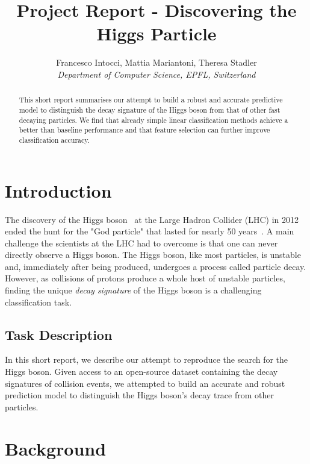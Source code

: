 \documentclass[10pt,conference,compsocconf]{IEEEtran}
\begin{document}
\title{Project Report - Discovering the Higgs Particle}

\author{
  Francesco Intocci, Mattia Mariantoni, Theresa Stadler\\
  \textit{Department of Computer Science, EPFL, Switzerland}
}

\maketitle

\begin{abstract}
This short report summarises our attempt to build a robust and accurate predictive model to distinguish the decay signature of the Higgs boson from that of other fast decaying particles. We find that already simple linear classification methods achieve a better than baseline performance and that feature selection can further improve classification accuracy.
\end{abstract}


\section{Introduction}

The discovery of the Higgs boson~\cite{Higgs1964} at the Large Hadron Collider (LHC) in 2012~\cite{Aad2012} ended the hunt for the "God particle" that lasted for nearly 50 years~\cite{CERN}. A main challenge the scientists at the LHC had to overcome is that one can never directly observe a Higgs boson. The Higgs boson, like most particles, is unstable and, immediately after being produced, undergoes a process called particle decay. However, as collisions of protons produce a whole host of unstable particles, finding the unique \emph{decay signature} of the Higgs boson is a challenging classification task.

\subsection{Task Description}
In this short report, we describe our attempt to reproduce the search for the Higgs boson. Given access to an open-source dataset containing the decay signatures of collision events, we attempted to build an accurate and robust prediction model to distinguish the Higgs boson's decay trace from other particles.

\section{Background}
\end{document}
